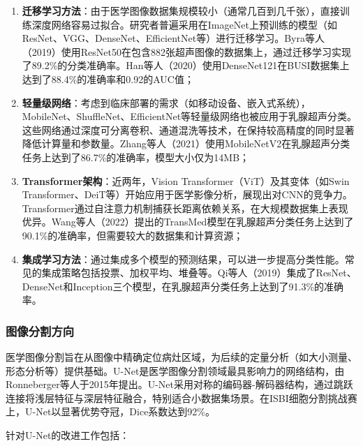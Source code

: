 \documentclass[supercite]{Hust-undergraduate-kaiti}
\theoremstyle{definition}
\begin{document}
\begin{enumerate}
    \item \textbf{迁移学习方法}：由于医学图像数据集规模较小（通常几百到几千张），直接训练深度网络容易过拟合。研究者普遍采用在ImageNet上预训练的模型（如ResNet、VGG、DenseNet\cite{ref7}、EfficientNet等）进行迁移学习。Byra等人（2019）使用ResNet50在包含882张超声图像的数据集上，通过迁移学习实现了89.2\%的分类准确率。Han等人（2020）使用DenseNet121在BUSI数据集上达到了88.4\%的准确率和0.92的AUC值；
    
    \item \textbf{轻量级网络}：考虑到临床部署的需求（如移动设备、嵌入式系统），MobileNet、ShuffleNet、EfficientNet等轻量级网络也被应用于乳腺超声分类。这些网络通过深度可分离卷积、通道混洗等技术，在保持较高精度的同时显著降低计算量和参数量。Zhang等人（2021）使用MobileNetV2在乳腺超声分类任务上达到了86.7\%的准确率，模型大小仅为14MB；
    
    \item \textbf{Transformer架构}：近两年，Vision Transformer（ViT）\cite{ref3}及其变体（如Swin Transformer、DeiT等）开始应用于医学影像分析，展现出对CNN的竞争力。Transformer通过自注意力机制捕获长距离依赖关系，在大规模数据集上表现优异。Wang等人（2022）提出的TransMed模型在乳腺超声分类任务上达到了90.1\%的准确率，但需要较大的数据集和计算资源；
    
    \item \textbf{集成学习方法}：通过集成多个模型的预测结果，可以进一步提高分类性能。常见的集成策略包括投票、加权平均、堆叠等。Qi等人（2019）集成了ResNet、DenseNet和Inception三个模型，在乳腺超声分类任务上达到了91.3\%的准确率。
\end{enumerate}

\subsubsection{图像分割方向}

医学图像分割旨在从图像中精确定位病灶区域，为后续的定量分析（如大小测量、形态分析等）提供基础。U-Net\cite{ref4}是医学图像分割领域最具影响力的网络结构，由Ronneberger等人于2015年提出。U-Net采用对称的编码器-解码器结构，通过跳跃连接将浅层特征与深层特征融合，特别适合小数据集场景。在ISBI细胞分割挑战赛上，U-Net以显著优势夺冠，Dice系数达到92\%。

针对U-Net的改进工作包括：
\end{document}
